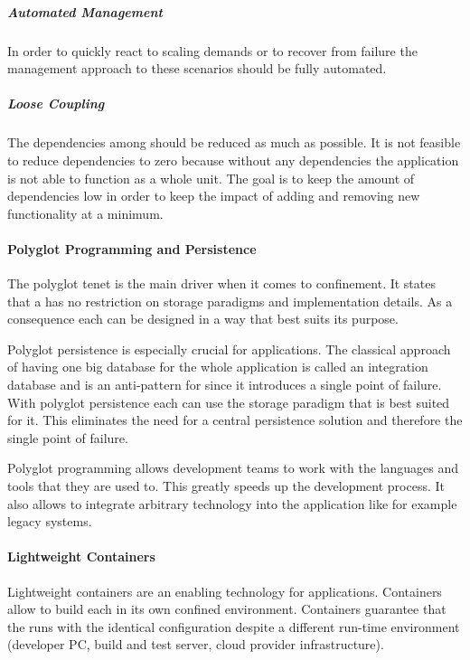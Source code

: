 \subparagraph{Automated Management}
In order to quickly react to scaling demands or to recover from failure the
management approach to these scenarios should be fully automated.

\subparagraph{Loose Coupling}

The dependencies among \mss{} should be reduced as much as possible. It is not
feasible to reduce dependencies to zero because without any dependencies the
application is not able to function as a whole unit. The goal is to keep the
amount of dependencies low in order to keep the impact of adding and removing
new functionality at a minimum.

\paragraph{Polyglot Programming and Persistence}

The polyglot tenet is the main driver when it comes to \ms{} confinement. It
states that a \ms{} has no restriction on storage paradigms and implementation
details. As a consequence each \ms{} can be designed in a way that best suits
its purpose.

Polyglot persistence is especially crucial for \ms{} applications. The classical
approach of having one big database for the whole application is called an
integration database and is an anti-pattern for \mss{} since it introduces a
single point of failure. With polyglot persistence each \ms{} can use the
storage paradigm that is best suited for it. This eliminates the need for a
central persistence solution and therefore the single point of failure.

Polyglot programming allows development teams to work with the languages and
tools that they are used to. This greatly speeds up the development process. It
also allows to integrate arbitrary technology into the application like for
example legacy systems.

\paragraph{Lightweight Containers}

Lightweight containers are an enabling technology for \ms{} applications.
Containers allow to build each \ms{} in its own confined environment. Containers
guarantee that the \ms{} runs with the identical configuration despite a
different run-time environment (developer PC, build and test server, cloud
provider infrastructure).

